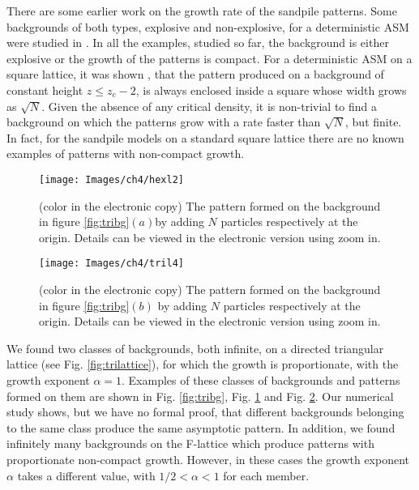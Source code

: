 \documentclass[11pt,a4paper]{book}
\begin{document}
There are some earlier work on the growth rate of the sandpile
patterns. Some backgrounds of both types, explosive and non-explosive, for a
deterministic ASM were studied in
\cite{explosion,fey}. In all the examples, studied so far,
the background is either explosive or the growth of the patterns is compact.
For a deterministic ASM on a square lattice, it was shown \cite{fey}, that the pattern produced on a background of constant height
$z\le z_{c}-2$, is always enclosed inside a square whose width grows as $\sqrt{N}$.
Given the absence of any
critical density, it is non-trivial to find a background on which the
patterns grow with a rate faster than $\sqrt{N}$, but finite. In fact,
for the sandpile models on a standard square
lattice there are no known examples of patterns with non-compact
growth.
\begin{figure}
\begin{center}
\texttt{[image: Images/ch4/hexl2]}
\caption{(color in the electronic copy) The pattern formed on the background in figure
\ref{fig:tribg}$(a)$by adding $N$ particles
respectively at the origin. Details can be viewed in the electronic
version using zoom in.}
\label{fig:hex}
\end{center}
\end{figure}
\begin{figure}
\begin{center}
\texttt{[image: Images/ch4/tril4]}
\caption{ (color in the electronic copy) The pattern formed on the background in figure
\ref{fig:tribg}$(b)$ by adding $N$ particles
respectively at the origin. Details can be viewed in the electronic
version using zoom in.}
\label{fig:tri}
\end{center}
\end{figure}

We found two classes of backgrounds, both infinite, on a directed
triangular lattice (see Fig. \ref{fig:trilattice}), for which the
growth is proportionate, with the growth exponent $\alpha=1$. Examples
of these classes of backgrounds and patterns formed on them are shown
in Fig. \ref{fig:tribg}, Fig. \ref{fig:hex} and Fig. \ref{fig:tri}. Our
numerical study shows, but we have no formal proof, that different
backgrounds belonging to the same class produce the same asymptotic
pattern. In addition, we found infinitely many backgrounds on the
F-lattice which produce patterns with proportionate non-compact
growth. However, in these cases the growth exponent $\alpha$ takes a
different value, with $1/2 < \alpha < 1$ for each member.
\end{document}

